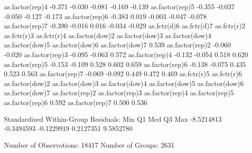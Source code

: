 \documentclass[11pt]{article}
\begin{document}
\begin{Schunk}
\begin{Soutput}
as.factor(rep)4 -0.371 -0.030      -0.081      -0.169      -0.139     
as.factor(rep)5 -0.355 -0.037      -0.050      -0.127      -0.173     
as.factor(rep)6 -0.383  0.019      -0.003      -0.047      -0.078     
as.factor(rep)7 -0.390 -0.016       0.016      -0.034      -0.029     
                as.fctr(d)6 as.fctr(d)7 as.fctr(r)2 as.fctr(r)3 as.fctr(r)4
as.factor(dow)2                                                            
as.factor(dow)3                                                            
as.factor(dow)4                                                            
as.factor(dow)5                                                            
as.factor(dow)6                                                            
as.factor(dow)7  0.539                                                     
as.factor(rep)2 -0.060      -0.020                                         
as.factor(rep)3 -0.095      -0.063       0.572                             
as.factor(rep)4 -0.132      -0.054       0.518       0.620                 
as.factor(rep)5 -0.153      -0.109       0.528       0.602       0.659     
as.factor(rep)6 -0.138      -0.075       0.435       0.523       0.563     
as.factor(rep)7 -0.069      -0.092       0.449       0.472       0.469     
                as.fctr(r)5 as.fctr(r)6
as.factor(dow)2                        
as.factor(dow)3                        
as.factor(dow)4                        
as.factor(dow)5                        
as.factor(dow)6                        
as.factor(dow)7                        
as.factor(rep)2                        
as.factor(rep)3                        
as.factor(rep)4                        
as.factor(rep)5                        
as.factor(rep)6  0.592                 
as.factor(rep)7  0.500       0.536     

Standardized Within-Group Residuals:
       Min         Q1        Med         Q3        Max 
-8.5214813 -0.3494593 -0.1229919  0.2127351  9.5852780 

Number of Observations: 18417
Number of Groups: 2631 
\end{Soutput}
\end{Schunk}
\end{document}

